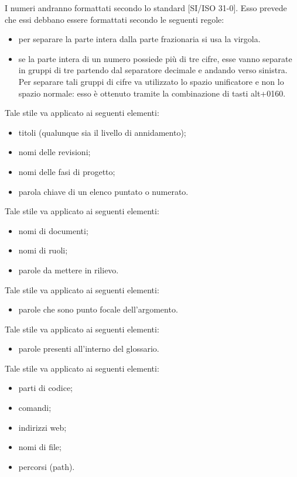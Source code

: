 						I numeri andranno formattati secondo lo standard [SI/ISO 31-0]. Esso prevede che essi debbano essere formattati secondo le seguenti regole:
						\begin{itemize}
							\item per separare la parte intera dalla parte frazionaria si usa la virgola.
							\item se la parte intera di un numero possiede più di tre cifre, esse vanno separate in gruppi di tre partendo dal separatore decimale e andando verso sinistra. Per separare tali gruppi di cifre va utilizzato lo spazio unificatore e non lo spazio normale: esso è ottenuto tramite la combinazione di tasti alt+0160.
						\end{itemize}
						Tale stile va applicato ai seguenti elementi:
						\begin{itemize}
							\item titoli (qualunque sia il livello di annidamento);
							\item nomi delle revisioni;
							\item nomi delle fasi di progetto;
							\item parola chiave di un elenco puntato o numerato.
						\end{itemize}
						Tale stile va applicato ai seguenti elementi:
						\begin{itemize}
							\item nomi di documenti;
							\item nomi di ruoli;
							\item parole da mettere in rilievo.
						\end{itemize}
						Tale stile va applicato ai seguenti elementi:
						\begin{itemize}
							\item parole che sono punto focale dell’argomento.
						\end{itemize}
						Tale stile va applicato ai seguenti elementi:
						\begin{itemize}
							\item parole presenti all’interno del glossario.
						\end{itemize}
						Tale stile va applicato ai seguenti elementi:
						\begin{itemize}
							\item parti di codice;
							\item comandi;
							\item indirizzi web;
							\item nomi di file;
							\item percorsi (path).
						\end{itemize}
